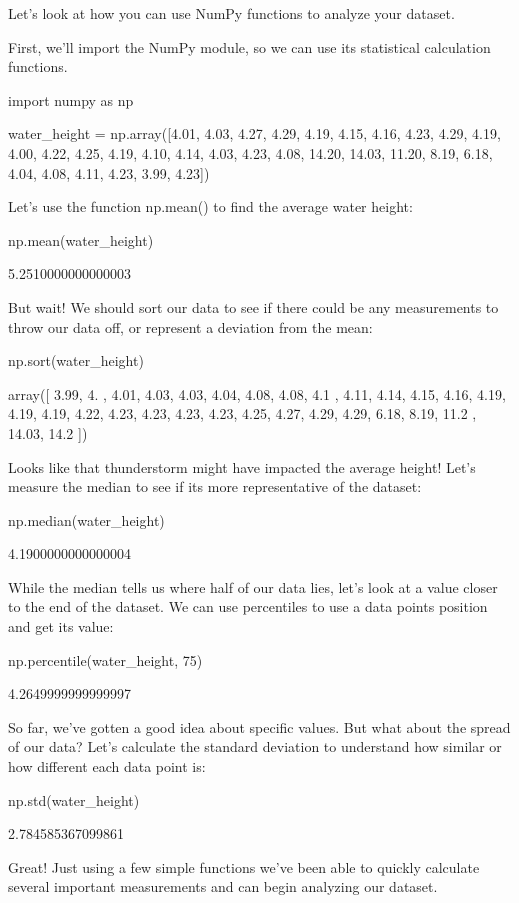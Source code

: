 \documentclass{journal}
\begin{document}
Let's look at how you can use NumPy functions to analyze your dataset.

First, we'll import the NumPy module, so we can use its statistical calculation functions.

import numpy as np

water_height = np.array([4.01, 4.03, 4.27, 4.29, 4.19,
                         4.15, 4.16, 4.23, 4.29, 4.19,
                         4.00, 4.22, 4.25, 4.19, 4.10,
                         4.14, 4.03, 4.23, 4.08, 14.20,
                         14.03, 11.20, 8.19, 6.18, 4.04,
                         4.08, 4.11, 4.23, 3.99, 4.23])

Let's use the function np.mean() to find the average water height:

np.mean(water_height)

5.2510000000000003

But wait! We should sort our data to see if there could be any measurements to throw our data off, or represent a deviation from the mean:

np.sort(water_height)

array([  3.99,   4.  ,   4.01,   4.03,   4.03,   4.04,   4.08,   4.08,
         4.1 ,   4.11,   4.14,   4.15,   4.16,   4.19,   4.19,   4.19,
         4.22,   4.23,   4.23,   4.23,   4.23,   4.25,   4.27,   4.29,
         4.29,   6.18,   8.19,  11.2 ,  14.03,  14.2 ])

Looks like that thunderstorm might have impacted the average height! Let's measure the median to see if its more representative of the dataset:

np.median(water_height)

4.1900000000000004

While the median tells us where half of our data lies, let's look at a value closer to the end of the dataset. We can use percentiles to use a data points position and get its value:

np.percentile(water_height, 75)

4.2649999999999997

So far, we've gotten a good idea about specific values. But what about the spread of our data? Let's calculate the standard deviation to understand how similar or how different each data point is:

np.std(water_height)

2.784585367099861

Great! Just using a few simple functions we've been able to quickly calculate several important measurements and can begin analyzing our dataset.
\end{document}
